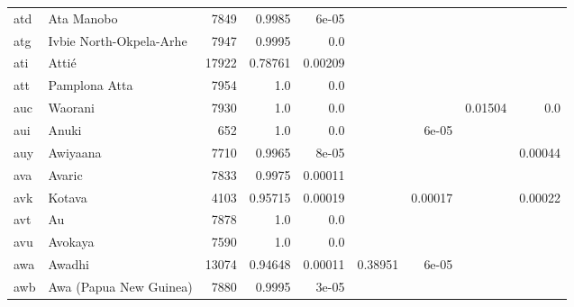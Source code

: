 \documentclass[11pt]{article}
\begin{document}
\begin{table*}[h]
{\begin{tabular}{llrrrrrrr}
atd         & Ata Manobo         & 7849         & 0.9985         & 6e-05         &          &          &          &          \\

atg         & Ivbie North-Okpela-Arhe         & 7947         & 0.9995         & 0.0         &          &          &          &          \\

ati         & Attié         & 17922         & 0.78761         & 0.00209         &          &          &          &          \\

att         & Pamplona Atta         & 7954         & 1.0         & 0.0         &          &          &          &          \\

auc         & Waorani         & 7930         & 1.0         & 0.0         &          &          & 0.01504         & 0.0         \\

aui         & Anuki         & 652         & 1.0         & 0.0         &          & 6e-05         &          &          \\

auy         & Awiyaana         & 7710         & 0.9965         & 8e-05         &          &          &          & 0.00044         \\

ava         & Avaric         & 7833         & 0.9975         & 0.00011         &          &          &          &          \\

avk         & Kotava         & 4103         & 0.95715         & 0.00019         &          & 0.00017         &          & 0.00022         \\

avt         & Au         & 7878         & 1.0         & 0.0         &          &          &          &          \\

avu         & Avokaya         & 7590         & 1.0         & 0.0         &          &          &          &          \\

awa         & Awadhi         & 13074         & 0.94648         & 0.00011         & 0.38951         & 6e-05         &          &          \\

awb         & Awa (Papua New Guinea)         & 7880         & 0.9995         & 3e-05         &          &          &          &          \\


\end{tabular}}
\end{table*}
\end{document}
